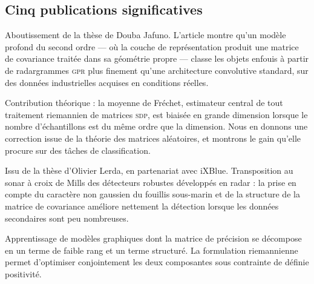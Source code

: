 \subsection{Cinq publications significatives}
\label{subsec:cv-publications-significatives}

Aboutissement de la thèse de Douba Jafuno. L'article montre qu'un modèle profond
du second ordre --- où la couche de représentation produit une matrice de
covariance traitée dans sa géométrie propre --- classe les objets enfouis à
partir de radargrammes \textsc{gpr} plus finement qu'une architecture
convolutive standard, sur des données industrielles acquises en conditions
réelles.

Contribution théorique : la moyenne de Fréchet, estimateur central de tout
traitement riemannien de matrices \textsc{sdp}, est biaisée en grande dimension
lorsque le nombre d'échantillons est du même ordre que la dimension. Nous en
donnons une correction issue de la théorie des matrices aléatoires, et montrons
le gain qu'elle procure sur des tâches de classification.

Issu de la thèse d'Olivier Lerda, en partenariat avec iXBlue. Transposition au
sonar à croix de Mills des détecteurs robustes développés en radar : la prise en
compte du caractère non gaussien du fouillis sous-marin et de la structure de la
matrice de covariance améliore nettement la détection lorsque les données
secondaires sont peu nombreuses.

Apprentissage de modèles graphiques dont la matrice de précision se décompose en
un terme de faible rang et un terme structuré. La formulation riemannienne
permet d'optimiser conjointement les deux composantes sous contrainte de définie
positivité.


